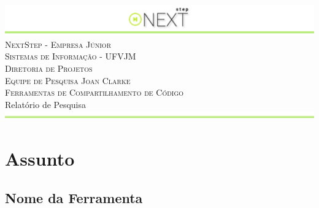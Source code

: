 \documentclass[a4paper, 12pt]{article}
\newcommand\equipe{Equipe de Pesquisa Joan Clarke}
\newcommand\projeto{Ferramentas de Compartilhamento de Código}
\newcommand\titulo{Relatório de Pesquisa}
\begin{document}
\begin{titlepage}

\begin{center}
\includegraphics[width=\linewidth]{../images/next_step_logo.png} \\[0.8cm]
\textsc{\LARGE NextStep - Empresa Júnior} \\[0.2cm]
\textsc{\LARGE Sistemas de Informação - UFVJM} \\[0.2cm]
\textsc{\LARGE Diretoria de Projetos} \\[0.2cm]
\textsc{\equipe} \\[1.3cm]
\vfill
\textsc{\LARGE \projeto} \\[0.8cm]
\vfill
\vfill
{\LARGE \titulo \\[0.4cm]}
\includegraphics[width=\linewidth]{../images/jc_rodape.png} \\[0.8cm]
\end{center}
\end{titlepage}
\clearpage


\section{Assunto}

\subsection{Nome da Ferramenta}
\end{document}
